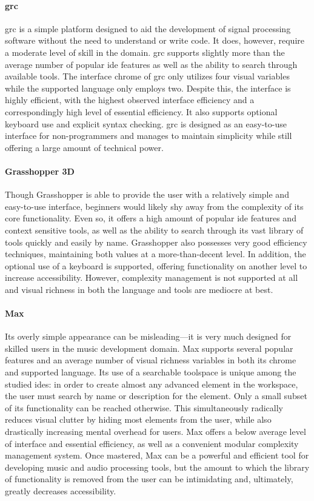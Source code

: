 \paragraph{\acl{grc}} \ac{grc} is a simple platform designed to aid the
development of signal processing software without the need to understand or
write code. It does, however, require a moderate level of skill in the
domain. \ac{grc} supports slightly more than the average number of popular
\ac{ide} features as well as the ability to search through available tools.
The interface chrome of \ac{grc} only utilizes four visual variables while the supported language
only employs two. Despite this, the interface is highly efficient, with the
highest observed interface efficiency and a correspondingly high level of
essential efficiency. It also supports optional keyboard use and
explicit syntax checking. \ac{grc} is designed as an easy-to-use interface
for non-programmers and manages to maintain simplicity while still offering a
large amount of technical power.

\paragraph{Grasshopper 3D} Though Grasshopper is able to provide the user
with a relatively simple and easy-to-use interface, beginners would likely
shy away from the complexity of its core functionality. Even so, it offers
a high amount of popular \ac{ide} features and context sensitive tools, as
well as the ability to search through its vast library of tools quickly and
easily by name. Grasshopper also possesses very good efficiency techniques,
maintaining both values at a more-than-decent level. In addition, the
optional use of a keyboard is supported, offering functionality on another
level to increase accessibility. However, complexity management is not supported at
all and visual richness in both the language and tools are
mediocre at best.

\paragraph{Max} Its overly simple appearance can be misleading---it is
very much designed for skilled users in the music development domain. Max
supports several popular features and an average number of visual
richness variables in both its chrome and supported language. Its use of a searchable
toolspace is unique among the studied \acp{ide}: in order to create
almost any advanced element in the workspace, the user must search by name
or description for the element. Only a small subset of its functionality
can be reached otherwise. This simultaneously radically reduces visual
clutter by hiding most elements from the user, while also drastically
increasing mental overhead for users. Max offers a below average level of
interface and essential efficiency, as well as a convenient modular
complexity management system. Once mastered, Max can be a powerful and
efficient tool for developing music and audio processing tools, but the
amount to which the library of functionality is removed from the user can
be intimidating and, ultimately, greatly decreases accessibility.


